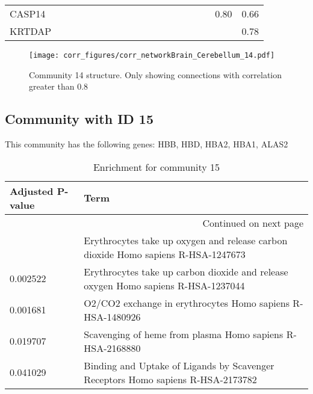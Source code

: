 \begin{longtable}{lrrrrrrrrrrrrrrrrrr}
CASP14    &               &            &           &              &               &            &            &            &             &           &                 &             &             &             &            &              &         0.80 &       0.66 \\
KRTDAP    &               &            &           &              &               &            &            &            &             &           &                 &             &             &             &            &              &              &       0.78 \\
\end{longtable}


\begin{figure}[h!]
\centering
\texttt{[image: corr\_figures/corr\_networkBrain\_Cerebellum\_14.pdf]}
\caption{Community 14 structure. Only showing connections with correlation greater than 0.8}
\end{figure}




\subsection*{Community with ID 15}
This community has the following genes: HBB, HBD, HBA2, HBA1, ALAS2
\\
\begin{longtable}{p{2.4cm}p{14.5cm}}
\caption{Enrichment for community 15}\\
\toprule
Adjusted \newline P-value &                                                                               Term \\
\midrule
\endhead
\midrule
\multicolumn{2}{r}{{Continued on next page}} \\
\midrule
\endfoot

\bottomrule
\endlastfoot
                 0.002141 &  Erythrocytes take up oxygen and release carbon dioxide Homo sapiens R-HSA-1247673 \\
                 0.002522 &  Erythrocytes take up carbon dioxide and release oxygen Homo sapiens R-HSA-1237044 \\
                 0.001681 &                         O2/CO2 exchange in erythrocytes Homo sapiens R-HSA-1480926 \\
                 0.019707 &                          Scavenging of heme from plasma Homo sapiens R-HSA-2168880 \\
                 0.041029 &    Binding and Uptake of Ligands by Scavenger Receptors Homo sapiens R-HSA-2173782 \\
\end{longtable}


